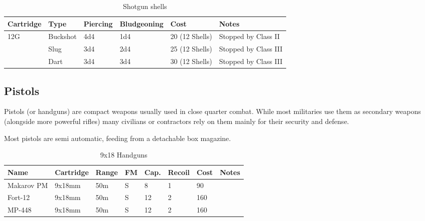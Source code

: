 \begin{table}
\begin{center}
\begin{tabular}{| l | l | l | l | l | l |}
    \end{tabular}
  \end{center}
\end{table}

\begin{table}
  \caption{Shotgun shells}
  \begin{center}
    \begin{tabular}{| l | l | l | l | l | l |}
      \hline
      \textbf{Cartridge}  & \textbf{Type}   & \textbf{Piercing} &
      \textbf{Bludgeoning} & \textbf{Cost}  & \textbf{Notes}        \\ \hline

      12G     & Buckshot & 4d4  & 1d4 & 20 (12 Shells) & Stopped by Class II \\ \hline
      \,      & Slug     & 3d4  & 2d4 & 25 (12 Shells) & Stopped by Class III \\ \hline
      \,      & Dart     & 3d4  & 3d4 & 30 (12 Shells) & Stopped by Class III \\ \hline

    \end{tabular}
  \end{center}
\end{table}

\subsection{Pistols}

Pistols (or handguns) are compact weapons usually used in close quarter combat.
While most militaries use them as secondary weapons (alongside more powerful
rifles) many civilians or contractors rely on them mainly for their security
and defense.

Most pistols are semi automatic, feeding from a detachable box magazine.

\begin{table}
  \caption{9x18 Handguns}
  \begin{center}
    \begin{tabular}{| l | l | l | l | l | l | l | l |}
      \hline
      \textbf{Name} & \textbf{Cartridge} & \textbf{Range} &
      \textbf{FM} & \textbf{Cap.} & \textbf{Recoil} &
      \textbf{Cost} & \textbf{Notes} \\ \hline

      Makarov PM & 9x18mm & 50m & S & 8  & 1 & 90  & \\ \hline
      Fort-12    & 9x18mm & 50m & S & 12 & 2 & 160 & \\ \hline
      MP-448     & 9x18mm & 50m & S & 12 & 2 & 160 & \\ \hline

    \end{tabular}
  \end{center}
\end{table}

